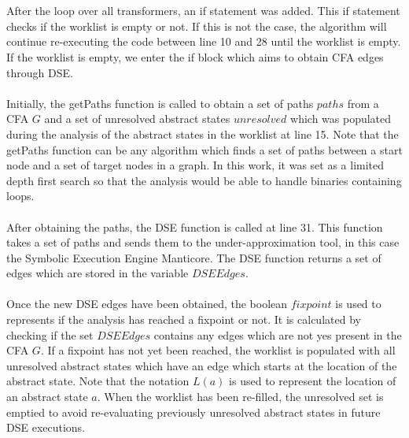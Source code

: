 \documentclass{kththesis}
\begin{document}
\\ \\
After the loop over all transformers, an if statement was added. This if statement checks if the worklist is empty or not. If this is not the case, the algorithm will continue re-executing the code between line 10 and 28 until the worklist is empty. If the worklist is empty, we enter the if block which aims to obtain CFA edges through DSE.
\\ \\
Initially, the getPaths function is called to obtain a set of paths $paths$ from a CFA $G$ and a set of unresolved abstract states $unresolved$ which was populated during the analysis of the abstract states in the worklist at line 15. Note that the getPaths function can be any algorithm which finds a set of paths between a start node and a set of target nodes in a graph. In this work, it was set as a limited depth first search so that the analysis would be able to handle binaries containing loops.
\\ \\
After obtaining the paths, the DSE function is called at line 31. This function takes a set of paths and sends them to the under-approximation tool, in this case the Symbolic Execution Engine Manticore. The DSE function returns a set of edges which are stored in the variable $DSEEdges$. 
\\ \\
Once the new DSE edges have been obtained, the boolean $fixpoint$ is used to represents if the analysis has reached a fixpoint or not. It is calculated by checking if the set $DSEEdges$ contains any edges which are not yes present in the CFA $G$. If a fixpoint has not yet been reached, the worklist is populated with all unresolved abstract states which have an edge which starts at the location of the abstract state. Note that the notation $L(a)$ is used to represent the location of an abstract state $a$. When the worklist has been re-filled, the unresolved set is emptied to avoid re-evaluating previously unresolved abstract states in future DSE executions. 
\end{document}
